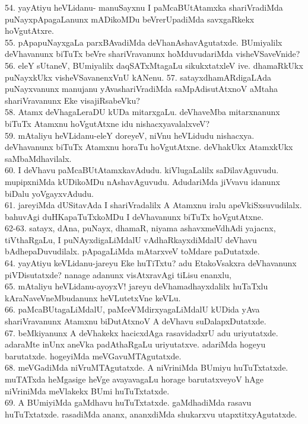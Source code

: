 \documentclass{article}
\begin{document}
54. yayAtiyu heVLidanu- manuSayxnu I paMcaBUtAtamxka shariVradiMda puNayxpApagaLanunx mADikoMDu beVrerUpadiMda savxgaRkekx hoVgutAtxre.\\
55. pApapuNayxgaLa parxBAvadiMda deVhanAshavAgutatxde. BUmiyalilx deVhavanunx biTuTx beVre shariVravanunx hoMduvudariMda visheVSaveVnide?\\
56. eleY sUtaneV, BUmiyalilx daqSATxMtagaLu sikukxtatxleV ive. dhamaRkUkx puNayxkUkx visheVSavanenxVnU kANenu.
57. satayxdhamARdigaLAda puNayxvanunx manujanu yAvashariVradiMda saMpAdisutAtxnoV aMtaha shariVravanunx Eke visajiRsabeVku?\\
58. Atamx deVhagaLeraDU kUDa mitarxgaLu. deVhaveMba mitarxnanunx biTuTx Atamxnu hoVgutAtxne idu nishacxyavalalxveV?\\
59. mAtaliyu heVLidanu-eleY doreyeV, niVnu heVLidudu nishacxya. deVhavanunx biTuTx Atamxnu horaTu hoVgutAtxne. deVhakUkx AtamxkUkx saMbaMdhavilalx.\\
60. I deVhavu paMcaBUtAtamxkavAdudu. kiVlugaLalilx saDilavAguvudu. mupipxniMda kUDikoMDu nAshavAguvudu. AdudariMda jiVvavu idanunx biDalu yoVgayxvAdudu.\\
61. jareyiMda dUSitavAda I shariVradalilx A Atamxnu iralu apeVkiSxsuvudilalx. bahuvAgi duHKapaTuTxkoMDu I deVhavanunx biTuTx hoVgutAtxne.\\
62-63. satayx, dAna, puNayx, dhamaR, niyama ashavxmeVdhAdi yajacnx, tiVthaRgaLu, I puNAyxdigaLiMdalU vAdhaRkayxdiMdalU deVhavu bAdhepaDuvudilalx. pApagaLiMda mAtarxveV toMdare paDutatxde.\\
64. yayAtiyu keVLidanu-jareyu Eke huTiTxtu? adu EtakoVsakxra deVhavanunx piVDisutatxde? nanage adanunx visAtxravAgi tiLisu enanxlu,\\
65. mAtaliyu heVLidanu-ayoyxV! jareyu deVhamadhayxdalilx huTaTxlu kAraNaveVneMbudanunx heVLutetxVne keVLu.\\
66. paMcaBUtagaLiMdalU, paMceVMdirxyagaLiMdalU kUDida yAva shariVravanunx Atamxnu biDutAtxnoV A deVhavu suDalapxDutatxde.\\
67. beMkiyanunx A deVhakekx hacicxdAga rasavidadxrU adu uriyutatxde. adaraMte inUnx aneVka padAthaRgaLu uriyutatxve. adariMda hogeyu barutatxde. hogeyiMda meVGavuMTAgutatxde.\\
68. meVGadiMda niVruMTAgutatxde. A niVriniMda BUmiyu huTuTxtatxde. muTATxda heMgasige heVge avayavagaLu horage barutatxveyoV hAge niVriniMda meVlakekx BUmi huTuTxtatxde.\\
69. A BUmiyiMda gaMdhavu huTuTxtatxde. gaMdhadiMda rasavu huTuTxtatxde. rasadiMda ananx, ananxdiMda shukarxvu utapxtitxyAgutatxde.\\
\end{document}

